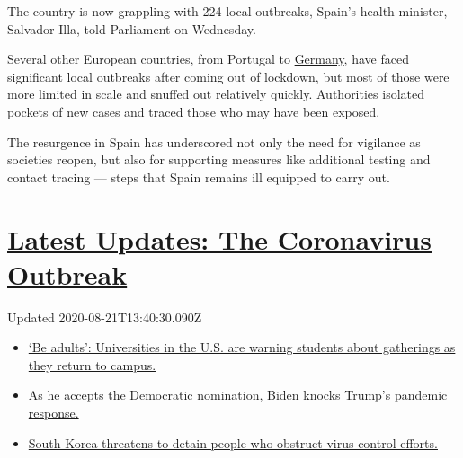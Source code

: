 The country is now grappling with 224 local outbreaks, Spain's health
minister, Salvador Illa, told Parliament on Wednesday.

Several other European countries, from Portugal to
\href{https://www.nytimes3xbfgragh.onion/2020/06/25/world/europe/germany-coronavirus-reopening.html}{Germany},
have faced significant local outbreaks after coming out of lockdown, but
most of those were more limited in scale and snuffed out relatively
quickly. Authorities isolated pockets of new cases and traced those who
may have been exposed.

The resurgence in Spain has underscored not only the need for vigilance
as societies reopen, but also for supporting measures like additional
testing and contact tracing --- steps that Spain remains ill equipped to
carry out.

\hypertarget{latest-updates-the-coronavirus-outbreak}{%
\section{\texorpdfstring{\href{https://www.nytimes3xbfgragh.onion/2020/08/21/world/covid-19-coronavirus.html?action=click\&pgtype=Article\&state=default\&region=MAIN_CONTENT_1\&context=storylines_live_updates}{Latest
Updates: The Coronavirus
Outbreak}}{Latest Updates: The Coronavirus Outbreak}}\label{latest-updates-the-coronavirus-outbreak}}

Updated 2020-08-21T13:40:30.090Z

\begin{itemize}
\tightlist
\item
  \href{https://www.nytimes3xbfgragh.onion/2020/08/21/world/covid-19-coronavirus.html?action=click\&pgtype=Article\&state=default\&region=MAIN_CONTENT_1\&context=storylines_live_updates\#link-6a60a19d}{`Be
  adults': Universities in the U.S. are warning students about
  gatherings as they return to campus.}
\item
  \href{https://www.nytimes3xbfgragh.onion/2020/08/21/world/covid-19-coronavirus.html?action=click\&pgtype=Article\&state=default\&region=MAIN_CONTENT_1\&context=storylines_live_updates\#link-324af071}{As
  he accepts the Democratic nomination, Biden knocks Trump's pandemic
  response.}
\item
  \href{https://www.nytimes3xbfgragh.onion/2020/08/21/world/covid-19-coronavirus.html?action=click\&pgtype=Article\&state=default\&region=MAIN_CONTENT_1\&context=storylines_live_updates\#link-191d44be}{South
  Korea threatens to detain people who obstruct virus-control efforts.}
\end{itemize}

